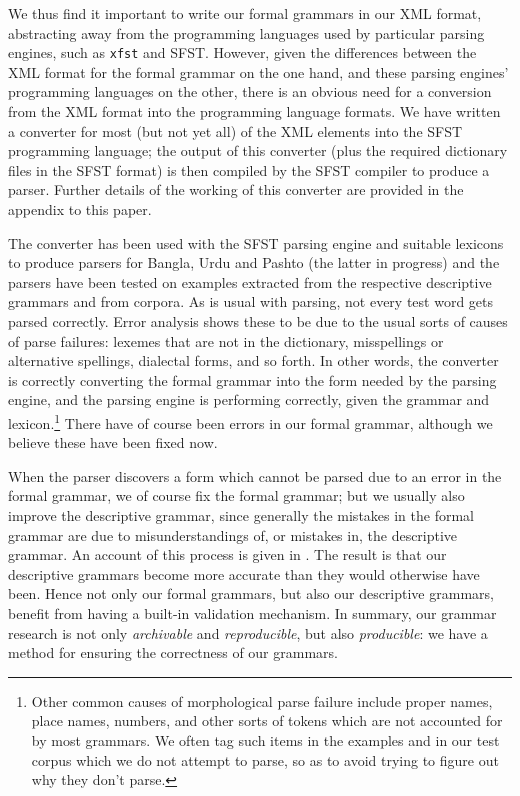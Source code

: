 We thus find it important to write our formal grammars in our XML format, abstracting away from the programming languages used by particular parsing engines, such as \texttt{xfst} and SFST. However, given the differences between the XML format for the formal grammar on the one hand, and these parsing engines' programming languages on the other, there is an obvious need for a conversion from the XML format into the programming language formats. We have written a converter for most (but not yet all) of the XML elements into the SFST programming language; the output of this converter (plus the required dictionary files in the SFST format) is then compiled by the SFST compiler to produce a parser. Further details of the working of this converter are provided in the appendix to this paper. 

The converter has been used with the SFST parsing engine and suitable lexicons to produce parsers for Bangla, Urdu and Pashto (the latter in progress) and the parsers have been tested on examples extracted from the respective descriptive grammars and from corpora. As is usual with parsing, not every test word gets parsed correctly. Error analysis shows these to be due to the usual sorts of causes of parse failures: lexemes that are not in the dictionary, misspellings or alternative spellings, dialectal forms, and so forth. In other words, the converter is correctly converting the formal grammar into the form needed by the parsing engine, and the parsing engine is performing correctly, given the grammar and lexicon.\footnote{Other
  common causes of morphological parse failure include proper names, place names, numbers, and other sorts of tokens which are not accounted for by most grammars. We often tag such items in the examples and in our test corpus which we do not attempt to parse, so as to avoid trying to figure out why they don't parse.
} 
There have of course been errors in our formal grammar, although we believe these have been fixed now. 

When the parser discovers a form which cannot be parsed due to an error in the formal grammar, we of course fix the formal grammar; but we usually also improve the descriptive grammar, since generally the mistakes in the formal grammar are due to misunderstandings of, or mistakes in, the descriptive grammar. An account of this process is given in \citet{DavidEtAl2008}. The result is that our descriptive grammars become more accurate than they would otherwise have been. Hence not only our formal grammars, but also our descriptive grammars, benefit from having a built-in validation mechanism. In summary, our grammar research is not only {\textit{archivable}} and {\textit{reproducible}}, but also {\textit{producible}}: we have a method for ensuring the correctness of our grammars.


